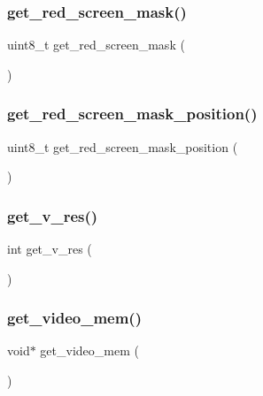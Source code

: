 \mbox{\label{group__video_gac758200041aed05cff7f056c48456157}} 
\subsubsection{\texorpdfstring{get\_red\_screen\_mask()}{get\_red\_screen\_mask()}}
{\footnotesize\ttfamily uint8\+\_\+t get\+\_\+red\+\_\+screen\+\_\+mask (\begin{DoxyParamCaption}{ }\end{DoxyParamCaption})}

\mbox{\label{group__video_ga5ad95fa9656e4db3ac20e178769336f9}} 
\subsubsection{\texorpdfstring{get\_red\_screen\_mask\_position()}{get\_red\_screen\_mask\_position()}}
{\footnotesize\ttfamily uint8\+\_\+t get\+\_\+red\+\_\+screen\+\_\+mask\+\_\+position (\begin{DoxyParamCaption}{ }\end{DoxyParamCaption})}

\mbox{\label{group__video_gaa6c3dbf699d3dda9444bdcd71bf85234}} 
\subsubsection{\texorpdfstring{get\_v\_res()}{get\_v\_res()}}
{\footnotesize\ttfamily int get\+\_\+v\+\_\+res (\begin{DoxyParamCaption}{ }\end{DoxyParamCaption})}

\mbox{\label{group__video_ga1d04069f4e8b1556a7a1ed2cd95bfdea}} 
\subsubsection{\texorpdfstring{get\_video\_mem()}{get\_video\_mem()}}
{\footnotesize\ttfamily void$\ast$ get\+\_\+video\+\_\+mem (\begin{DoxyParamCaption}{ }\end{DoxyParamCaption})}

